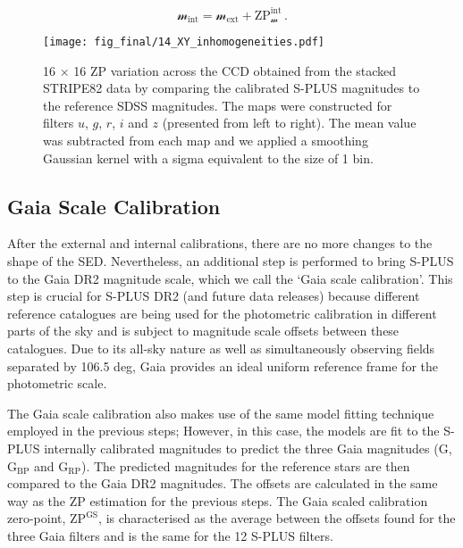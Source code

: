 \documentclass[fleqn,usenatbib]{mnras}
\begin{document}
\begin{equation}
    \mathcal{m}_{\mathrm{int}} = \mathcal{m}_{\mathrm{ext}} + \mathrm{ZP}_\mathcal{m}^{\mathrm{int}} \,.
\end{equation}

\begin{figure*}
\centering
\texttt{[image: fig\_final/14\_XY\_inhomogeneities.pdf]}
\caption{16 $\times$ 16 ZP variation across the CCD obtained from the stacked STRIPE82 data by comparing the calibrated S-PLUS magnitudes to the reference SDSS magnitudes. The maps were constructed for filters $u$, $g$, $r$, $i$ and $z$ (presented from left to right). The mean value was subtracted from each map and we applied a smoothing Gaussian kernel with a sigma equivalent to the size of 1 bin.}
\label{fig:XY_offsets}
\end{figure*}

\subsection{Gaia Scale Calibration}
\label{sec:gaia_scale_calibration}

After the external and internal calibrations, there are no more changes to the shape of the SED. Nevertheless, an additional step is performed to bring S-PLUS to the Gaia DR2 \citep{GaiaCollaboration+2018} magnitude scale, which we call the `Gaia scale calibration'. This step is crucial for S-PLUS DR2 (and future data releases) because different reference catalogues are being used for the photometric calibration in different parts of the sky and is subject to magnitude scale offsets between these catalogues. Due to its all-sky nature as well as simultaneously observing fields separated by 106.5 deg, Gaia provides an ideal uniform reference frame for the photometric scale. 

The Gaia scale calibration also makes use of the same model fitting technique employed in the previous steps; However, in this case, the models are fit to the S-PLUS internally calibrated magnitudes to predict the three Gaia magnitudes ($\mathrm{G}$, $\mathrm{G}_\mathrm{BP}$ and $\mathrm{G}_\mathrm{RP}$). The predicted magnitudes for the reference stars are then compared to the Gaia DR2 magnitudes. The offsets are calculated in the same way as the ZP estimation for the previous steps. The Gaia scaled calibration zero-point, $\mathrm{ZP}^\mathrm{GS}$, is characterised as the average between the offsets found for the three Gaia filters and is the same for the 12 S-PLUS filters.
\end{document}
